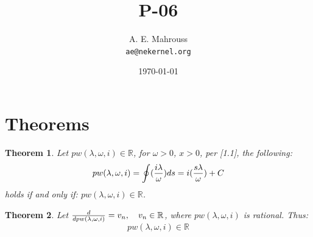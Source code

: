 \documentclass[11pt, a4paper]{article}
\title{P-06}
\author{A. E. Mahrouss\\\texttt{ae@nekernel.org}}
\date{\today}
\theoremstyle{plain}
\newtheorem{theorem}{Theorem}[section]
\theoremstyle{definition}
\theoremstyle{remark}
\begin{document}
\twocolumn[{%
  \maketitle
  \vspace{-0.5em}
  \vspace{0.8em}
  \rule{\linewidth}{0.4pt}
  \vspace{1em}
}]

\maketitle

\section{Theorems}

\begin{theorem}
  Let $pw(\lambda, \omega, i) \in \mathbb{R}$, for $\omega > 0$, $x > 0$, per [1.1], the following:
  \begin{equation}
    pw(\lambda, \omega, i) = \oint (\frac{i \lambda}{\omega}) \space ds = i(\frac{s \lambda}{\omega}) + C
  \end{equation}
  holds if and only if: $pw(\lambda, \omega, i) \in \mathbb{R}$.
\end{theorem}

\begin{theorem}
  Let $\frac{d}{d\space pw(\lambda, \omega, i) } = v_{n}, \quad v_{n} \in \mathbb{R}$, where $ pw(\lambda, \omega, i) $ is rational. Thus:
  \begin{equation}
    pw(\lambda, \omega, i) \in \mathbb{R}
  \end{equation}
\end{theorem}
\end{document}
